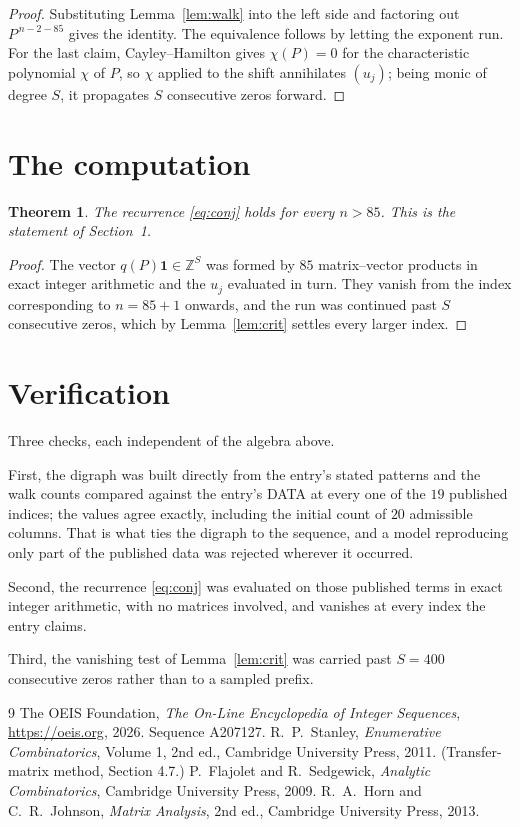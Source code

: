 \documentclass[11pt,a4paper]{article}
\theoremstyle{plain}
\newtheorem{theorem}{Theorem}
\theoremstyle{definition}
\begin{document}
\begin{proof}
Substituting Lemma~\ref{lem:walk} into the left side and factoring out
$P^{\,n-2-85}$ gives the identity. The equivalence follows by letting the exponent
run. For the last claim, Cayley--Hamilton gives $\chi(P)=0$ for the characteristic
polynomial $\chi$ of $P$, so $\chi$ applied to the shift annihilates $(u_j)$; being monic of
degree $S$, it propagates $S$ consecutive zeros forward.
\end{proof}

\section{The computation}

\begin{theorem}
The recurrence \eqref{eq:conj} holds for every $n>85$. This is the statement of
Section~1.
\end{theorem}

\begin{proof}
The vector $q(P)\mathbf{1}\in\mathbb{Z}^{S}$ was formed by $85$ matrix--vector
products in exact integer arithmetic and the $u_j$ evaluated in turn. They vanish from the
index corresponding to $n=85+1$ onwards, and the run was continued past $S$ consecutive
zeros, which by Lemma~\ref{lem:crit} settles every larger index.
\end{proof}

\section{Verification}

Three checks, each independent of the algebra above.

First, the digraph was built directly from the entry's stated patterns and the walk counts
compared against the entry's DATA at every one of the $19$ published indices; the
values agree exactly, including the initial count of $20$ admissible columns. That is
what ties the digraph to the sequence, and a model reproducing only part of the published
data was rejected wherever it occurred.

Second, the recurrence \eqref{eq:conj} was evaluated on those published terms in exact
integer arithmetic, with no matrices involved, and vanishes at every index the entry claims.

Third, the vanishing test of Lemma~\ref{lem:crit} was carried past $S=400$ consecutive
zeros rather than to a sampled prefix.

\begin{thebibliography}{9}
 The OEIS Foundation, \emph{The On-Line Encyclopedia of Integer
Sequences}, \url{https://oeis.org}, 2026. Sequence A207127.
 R.~P.~Stanley, \emph{Enumerative Combinatorics}, Volume 1, 2nd ed.,
Cambridge University Press, 2011. (Transfer-matrix method, Section 4.7.)
 P.~Flajolet and R.~Sedgewick, \emph{Analytic Combinatorics}, Cambridge
University Press, 2009.
 R.~A.~Horn and C.~R.~Johnson, \emph{Matrix Analysis}, 2nd ed., Cambridge
University Press, 2013.
\end{thebibliography}
\end{document}
